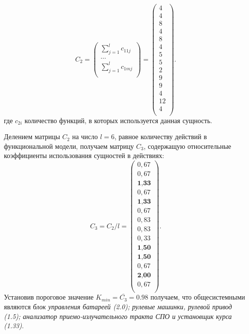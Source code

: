 \begin{equation*}
    C_2 = \begin{pmatrix}
        \sum_{j=1}^l c_{11j} \\
        \ldots \\
        \sum_{j=1}^l c_{1mj} \\
    \end{pmatrix} 
    =
    \begin{pmatrix}
        4 \\
        4 \\
        8 \\
        4 \\
        8 \\
        4 \\
        5 \\
        5 \\
        2 \\
        9 \\
        9 \\
        4 \\
        12 \\
        4 \\
    \end{pmatrix}.
\end{equation*}
где $c_{2i}$ количество функций, в которых используется данная сущность.

Делением матрицы $C_2$ на число $l = 6$, равное количеству действий в функциональной модели, получаем матрицу $C_3$,
содержащую относительные коэффициенты использования сущностей в действиях:
\begin{equation}
    C_3 = C_2 / l = \begin{pmatrix}
        0,67 \\
        0,67 \\
        \textbf{1,33} \\
        0,67 \\
        \textbf{1,33} \\
        0,67 \\
        0,83 \\
        0,83 \\
        0,33 \\
        \textbf{1,50} \\
        \textbf{1,50} \\
        0,67 \\
        \textbf{2,00} \\
        0,67 \\
    \end{pmatrix}.
\end{equation}
Установив пороговое значение $K_{min} = \overline{C_3} = 0.98$ получаем, что общесистемными являются
\textit{блок управления батареей (2.0);
    рулевые машинки, рулевой привод (1.5);
    анализатор приемо-излучательного тракта СПО и установщик курса (1.33)}.

